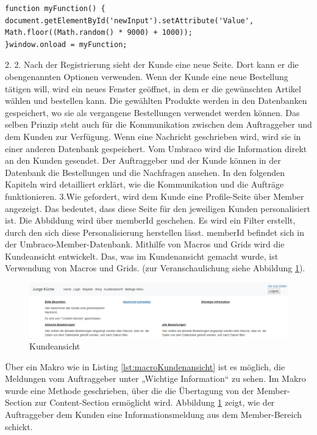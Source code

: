 \begin{lstlisting}[caption={JavaScript PIN Generator}, label=lst:PINgenerator]
function myFunction() {
document.getElementById('newInput').setAttribute('Value', Math.floor((Math.random() * 9000) + 1000));
}window.onload = myFunction;
\end{lstlisting}


2. 2.	Nach der Registrierung sieht der Kunde eine neue Seite. Dort kann er die obengenannten Optionen verwenden. Wenn der Kunde eine neue Bestellung tätigen will, wird ein neues Fenster geöffnet, in dem er die gewünschten Artikel wählen und bestellen kann. Die gewählten Produkte werden in den Datenbanken gespeichert, wo sie als vergangene Bestellungen verwendet werden können. Das selben Prinzip steht auch für die Kommunikation zwischen dem Auftraggeber und dem Kunden zur Verfügung. Wenn eine Nachricht geschrieben wird, wird sie in einer anderen Datenbank gespeichert. Vom Umbraco wird die Information direkt an den Kunden gesendet. Der Auftraggeber und der Kunde können in der Datenbank die Bestellungen und die Nachfragen ansehen. In den folgenden Kapiteln wird detailliert erklärt, wie die Kommunikation und die Aufträge funktionieren. 
3.Wie gefordert, wird dem Kunde eine Profile-Seite über Member angezeigt. Das bedeutet, dass diese Seite für den jeweiligen Kunden personalisiert ist. Die Abbildung wird über memberId geschehen. Es wird ein Filter erstellt, durch den sich diese Personalisierung herstellen lässt. memberId befindet sich in der Umbraco-Member-Datenbank. Mithilfe von Macros und Grids wird die Kundeansicht entwickelt. 
Das, was im Kundenansicht gemacht wurde, ist Verwendung von Macros und Grids. (zur Veranschaulichung siehe Abbildung  \ref{fig:kundenansichtNew}). 

\begin{figure}[h]
	\centering
	\includegraphics[width=1\linewidth]{Graphics/kundenansichtNew.png}
	\caption[Kundeansicht]{Kundeansicht}
	\label{fig:kundenansichtNew}
\end{figure}

Über ein Makro wie in Listing \ref{lst:macroKundenansicht} ist es möglich, die Meldungen vom Auftraggeber unter „Wichtige Information“ zu sehen. Im Makro wurde eine Methode geschrieben, über die die Übertagung von der Member-Section zur Content-Section ermöglicht wird. Abbildung \ref{fig:kundenansichtNew} zeigt, wie der Auftraggeber dem Kunden eine Informationsmeldung aus dem Member-Bereich schickt.

